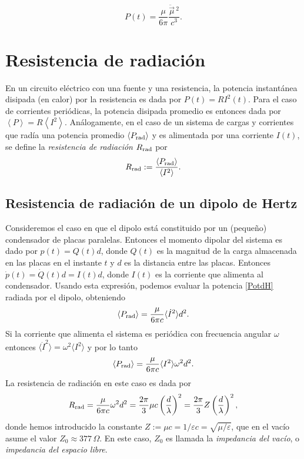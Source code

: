 \begin{equation}\label{Pdipmag}
\boxed{P(t)=\frac{\mu}{6\pi}\frac{\ddot{\vec{\mu}}{\,}^2}{c^3}.}
\end{equation}

\section{Resistencia de radiación}

En un circuito eléctrico con una fuente y una resistencia, la potencia instantánea disipada (en calor) por la resistencia es dada por $P(t)=RI^2(t)$. Para el caso de corrientes periódicas, la potencia disipada promedio es entonces dada por $\left\langle P\right\rangle=R\left\langle I^2\right\rangle$.
Análogamente, en el caso de un sistema de cargas y corrientes que radía una potencia promedio $\left\langle P_{\rm rad}\right\rangle$ y es alimentada por una corriente $I(t)$, se define la \textit{resistencia de radiación} $R_{\rm rad}$ por
\begin{equation}
R_{\rm rad}:=\frac{\left\langle P_{\rm rad}\right\rangle}{\left\langle I^2\right\rangle}.
\end{equation}

\subsection{Resistencia de radiación de un dipolo de Hertz}\label{sec:RRdH}
Consideremos el caso en que el dipolo está constituido por un (pequeño) condensador de placas paralelas. Entonces el momento dipolar del sistema es dado por $p(t)=Q(t)d$, donde $Q(t)$ es la magnitud de la carga almacenada en las placas en el instante $t$ y $d$ es la distancia entre las placas. Entonces $\dot{p}(t)=\dot{Q}(t)d=I(t)d$, donde $I(t)$ es la corriente que alimenta al condensador. Usando esta expresión, podemos evaluar la potencia \eqref{PotdH} radiada por el dipolo, obteniendo
\begin{equation}
\left\langle P_{\rm rad}\right\rangle=\frac{\mu}{6\pi c}{\langle\dot{I}^2\rangle d^2}.
\end{equation}
Si la corriente que alimenta el sistema es periódica con frecuencia angular $\omega$ entonces $\langle\dot{I}^2\rangle=\omega^2\langle I^2\rangle$ y por lo tanto
\begin{equation}
\left\langle P_{\rm rad}\right\rangle=\frac{\mu}{6\pi c}{\langle I^2\rangle \omega^2d^2}.
\end{equation}
La resistencia de radiación en este caso es dada por
\begin{equation}\label{Rradp}
R_{\rm rad}=\frac{\mu}{6\pi c}{\omega^2d^2}
=\frac{2\pi}{3}\mu c\left(\frac{d}{\lambda}\right)^2
=\frac{2\pi}{3}Z\left(\frac{d}{\lambda}\right)^2,
\end{equation}
donde hemos introducido la constante $Z:=\mu c=1/\varepsilon c=\sqrt{\mu/\varepsilon}$, que en el vacío asume el valor $Z_0\approx 377\,\Omega$. En este caso, $Z_0$ es llamada la \textit{impedancia del vacío}, o \textit{impedancia del espacio libre}.

